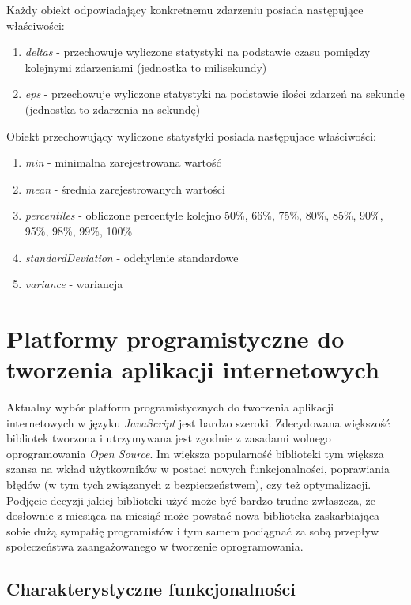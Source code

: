 \documentclass[polish, twoside, 12pt]{mwart}
\let\stdsection\section
\renewcommand*{\section}{\clearpage\stdsection}
\begin{document}
Każdy obiekt odpowiadający konkretnemu zdarzeniu posiada następujące właściwości:

\begin{enumerate}
  \item \emph{deltas} - przechowuje wyliczone statystyki na podstawie czasu pomiędzy kolejnymi zdarzeniami (jednostka to milisekundy)
  \item \emph{eps} - przechowuje wyliczone statystyki na podstawie ilości zdarzeń na sekundę (jednostka to zdarzenia na sekundę)
\end{enumerate}

Obiekt przechowujący wyliczone statystyki posiada następujace właściwości:

\begin{enumerate}
  \item \emph{min} - minimalna zarejestrowana wartość
  \item \emph{mean} - średnia zarejestrowanych wartości
  \item \emph{percentiles} - obliczone percentyle kolejno 50\%, 66\%, 75\%, 80\%, 85\%, 90\%, 95\%, 98\%, 99\%, 100\%
  \item \emph{standardDeviation} - odchylenie standardowe
  \item \emph{variance} - wariancja
\end{enumerate}

\section{Platformy programistyczne do tworzenia aplikacji internetowych}

Aktualny wybór platform programistycznych do tworzenia aplikacji internetowych w języku \emph{JavaScript} jest bardzo szeroki. Zdecydowana większość bibliotek tworzona i utrzymywana jest zgodnie z zasadami wolnego oprogramowania \emph{Open Source}. Im większa popularność biblioteki tym większa szansa na wkład użytkowników w postaci nowych funkcjonalności, poprawiania błędów (w tym tych związanych z bezpieczeństwem), czy też optymalizacji. Podjęcie decyzji jakiej biblioteki użyć może być bardzo trudne zwłaszcza, że dosłownie z miesiąca na miesiąć może powstać nowa biblioteka zaskarbiająca sobie dużą sympatię programistów i tym samem pociągnać za sobą przepływ społeczeństwa zaangażowanego w tworzenie oprogramowania. 

\subsection{Charakterystyczne funkcjonalności}
\end{document}
